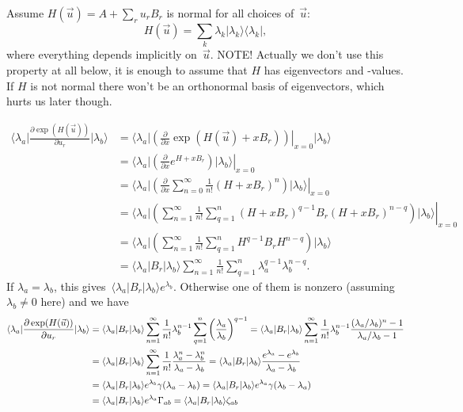 \documentclass[aps,pra,12pt,showpacs,showkeys,nofootinbib,superscriptaddress,longbibliography]{revtex4}
\newcommand{\bra}[1]{\mbox{$\langle #1|$}}
\newcommand{\ket}[1]{\mbox{$|#1\rangle$}}
\newcommand{\ketbra}[2]{\mbox{$|#1\rangle\langle #2|$}}
\newcommand{\pde}[2]{\frac{\partial #1}{\partial #2}}
\newcommand{\be}{\begin{equation}}
\newcommand{\ee}{\end{equation}}
\begin{document}
Assume $H(\vec{u}) = A +\sum_{r} u_{r} B_r$ is normal for all choices of~$\vec{u}$:
\be
H(\vec{u}) = \sum_k \lambda_k \ketbra{\lambda_k}{\lambda_k},
\ee
where everything depends implicitly on~$\vec{u}$.
NOTE! Actually we don't use this property at all below, it is enough
to assume that $H$ has eigenvectors and -values.
If $H$ is not normal there won't be an orthonormal basis of eigenvectors, which
hurts us later though.


\begin{align*}
\bra{\lambda_a} \pde{\exp(H(\vec{u}))}{u_{r}} \ket{\lambda_b} 
&=
\bra{\lambda_a} \left. \left(\pde{}{x} \exp(H(\vec{u}) +x
B_r)\right)\right|_{x = 0}  \ket{\lambda_b}\\
&=
\left. \bra{\lambda_a} \left(\pde{}{x} e^{H +x B_r}\right)
\ket{\lambda_b} \right|_{x = 0}\\
&=
\left. \bra{\lambda_a} \left(\pde{}{x} \sum_{n=0}^\infty
\frac{1}{n!}(H +x B_r)^n \right) \ket{\lambda_b} \right|_{x = 0}\\
&=
\left. \bra{\lambda_a} \left(\sum_{n=1}^\infty \frac{1}{n!}
\sum_{q=1}^n (H +x B_r)^{q-1} B_r (H +x B_r)^{n-q} \right) \ket{\lambda_b} \right|_{x = 0}\\
&=
\bra{\lambda_a} \left(\sum_{n=1}^\infty \frac{1}{n!}
\sum_{q=1}^n H^{q-1} B_r H^{n-q} \right) \ket{\lambda_b}\\
&=
\bra{\lambda_a} B_r \ket{\lambda_b} \sum_{n=1}^\infty \frac{1}{n!}
\sum_{q=1}^n \lambda_a^{q-1} \lambda_b^{n-q}.
\end{align*}
If $\lambda_a = \lambda_b$, this gives~$\bra{\lambda_a} B_r \ket{\lambda_b} e^{\lambda_b}$.
Otherwise one of them is nonzero (assuming $\lambda_b \neq 0$ here)
and we have
\begin{align}
\notag
\bra{\lambda_a} \pde{\exp(H(\vec{u}))}{u_{r}} \ket{\lambda_b} 
&=
\bra{\lambda_a} B_r \ket{\lambda_b} \sum_{n=1}^\infty \frac{1}{n!}
\lambda_b^{n-1} \sum_{q=1}^n \left(\frac{\lambda_a}{\lambda_b} \right)^{q-1}
=
\bra{\lambda_a} B_r \ket{\lambda_b} \sum_{n=1}^\infty \frac{1}{n!}
\lambda_b^{n-1} \frac{(\lambda_a/\lambda_b)^n-1}{\lambda_a/\lambda_b - 1}\\
\notag
&=
\bra{\lambda_a} B_r \ket{\lambda_b} \sum_{n=1}^\infty \frac{1}{n!}
\frac{\lambda_a^n - \lambda_b^n}{\lambda_a - \lambda_b}
=
\bra{\lambda_a} B_r \ket{\lambda_b}
\frac{e^{\lambda_a} - e^{\lambda_b}}{\lambda_a - \lambda_b}\\
\notag
&=
\bra{\lambda_a} B_r \ket{\lambda_b} e^{\lambda_b} \gamma(\lambda_a - \lambda_b)
=
\bra{\lambda_a} B_r \ket{\lambda_b} e^{\lambda_a} \gamma(\lambda_b - \lambda_a)\\
&=
\bra{\lambda_a} B_r \ket{\lambda_b} e^{\lambda_a} \Gamma_{ab}
= \bra{\lambda_a} B_r \ket{\lambda_b} \zeta_{ab}
\label{eq:expgrad}
\end{align}
\end{document}

